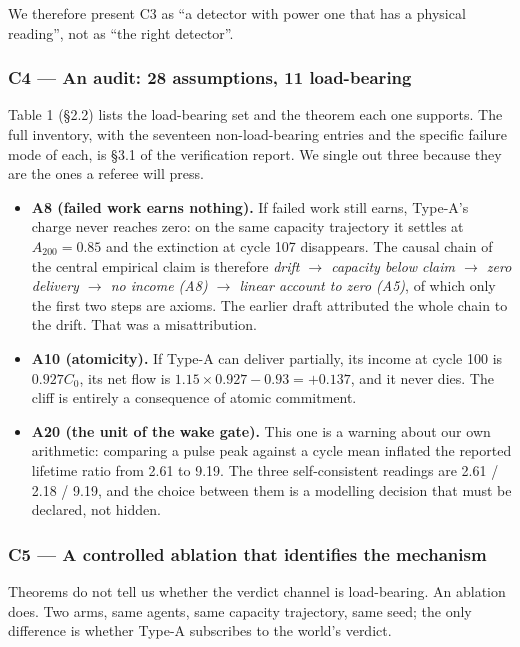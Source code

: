 \documentclass[11pt,a4paper]{article}
\providecommand{\tightlist}{\setlength{\itemsep}{0pt}\setlength{\parskip}{0pt}}
\begin{document}
We therefore present C3 as ``a detector with power one that has a physical
reading'', not as ``the right detector''.

\subsubsection{C4 --- An audit: 28 assumptions, 11 load-bearing}\label{c4-an-audit-28-assumptions-11-load-bearing}

Table 1 (§2.2) lists the load-bearing set and the theorem each one supports. The
full inventory, with the seventeen non-load-bearing entries and the specific
failure mode of each, is §3.1 of the verification report. We single out three
because they are the ones a referee will press.

\begin{itemize}
\tightlist
\item
  \textbf{A8 (failed work earns nothing).} If failed work still earns, Type-A's charge
  never reaches zero: on the same capacity trajectory it settles at
  \(A_{200}=0.85\) and the extinction at cycle 107 disappears. The causal chain of
  the central empirical claim is therefore
  \emph{drift \(\to\) capacity below claim \(\to\) zero delivery \(\to\) no income (A8) \(\to\) linear
  account to zero (A5)}, of which only the first two steps are axioms. The
  earlier draft attributed the whole chain to the drift. That was a misattribution.
\item
  \textbf{A10 (atomicity).} If Type-A can deliver partially, its income at cycle 100
  is \(0.927C_0\), its net flow is \(1.15\times0.927-0.93=+0.137\), and it never
  dies. The cliff is entirely a consequence of atomic commitment.
\item
  \textbf{A20 (the unit of the wake gate).} This one is a warning about our own
  arithmetic: comparing a pulse peak against a cycle mean inflated the reported
  lifetime ratio from 2.61 to 9.19. The three self-consistent readings are
  2.61 / 2.18 / 9.19, and the choice between them is a modelling decision that
  must be declared, not hidden.
\end{itemize}

\subsubsection{C5 --- A controlled ablation that identifies the mechanism}\label{c5-a-controlled-ablation-that-identifies-the-mechanism}

Theorems do not tell us whether the verdict channel is load-bearing. An ablation
does. Two arms, same agents, same capacity trajectory, same seed; the only
difference is whether Type-A subscribes to the world's verdict.
\end{document}
